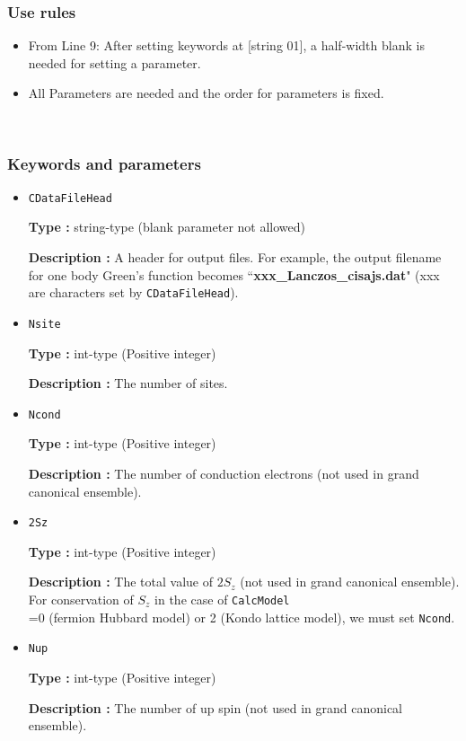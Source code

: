 \subsubsection{Use rules}
\begin{itemize}
\item From Line 9: After setting keywords at [string 01], a half-width blank is needed for setting a parameter.
\item All Parameters are needed and the order for parameters is fixed.
\end{itemize}

~\subsubsection{Keywords and parameters}
 \begin{itemize}
  \item  \verb|CDataFileHead|

 {\bf Type :} string-type (blank parameter not allowed)

{\bf Description :} A header for output files. For example, the output filename for one body Green's function becomes ``{\bf xxx\_Lanczos\_cisajs.dat}" (xxx are characters set by \verb|CDataFileHead|). 
   
 \item  \verb|Nsite|

{\bf Type :} int-type (Positive integer)

{\bf Description :} The number of sites.  


 \item  \verb|Ncond|

{\bf Type :} {int-type (Positive integer)}

{\bf Description :} {The number of conduction electrons (not used in grand canonical ensemble). }

 \item  \verb|2Sz|

{\bf Type :} {int-type (Positive integer)}

{\bf Description :} {The total value of $2S_z$ (not used in grand canonical ensemble). For conservation of $S_z$ in the case of } \verb|CalcModel| \\
 { =0 (fermion Hubbard model) or 2 (Kondo lattice model), we must set} \verb|Ncond|.

 \item  \verb|Nup|

{\bf Type :} int-type (Positive integer)

{\bf Description :} The number of up spin (not used in grand canonical ensemble). 


\end{itemize}
